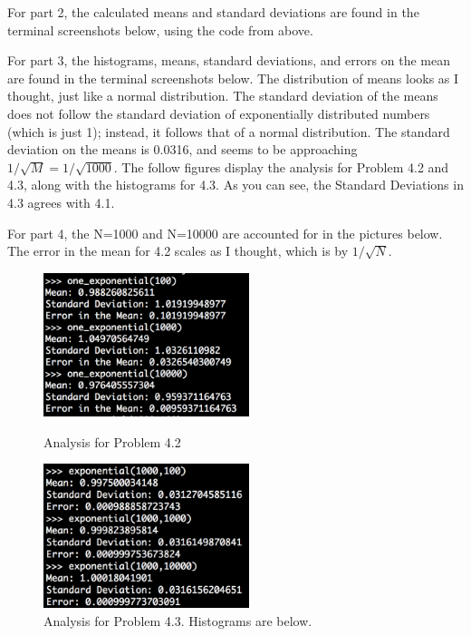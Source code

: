 \documentclass[12pt]{article}
\begin{document}
For part 2, the calculated means and standard deviations are found in the terminal screenshots below, using the code from above. 

For part 3, the histograms, means, standard deviations, and errors on the mean are found in the terminal screenshots below. The distribution of means looks as I thought, just like a normal distribution. The standard deviation of the means does not follow the standard deviation of exponentially distributed numbers (which is just 1); instead, it follows that of a normal distribution. The standard deviation on the means is 0.0316, and seems to be approaching $1/\sqrt{M} = 1/\sqrt{1000}$.
 The follow figures display the analysis for Problem 4.2 and 4.3, along with the histograms for 4.3. As you can see, the Standard Deviations in 4.3 agrees with 4.1. 

For part 4, the N=1000 and N=10000 are accounted for in the pictures below. The error in the mean for 4.2 scales as I thought, which is by $1/\sqrt{N}$.

\begin{figure}[ht]
	\centering
	\begin{minipage}[b]{0.47\linewidth}
		\includegraphics[width = 6cm]{P4_2.PNG}
		\caption{Analysis for Problem 4.2}
		\label{fig:minipage1}
	\end{minipage}
	\quad
	\begin{minipage}[b]{0.47\linewidth}
		\includegraphics[width = 6cm]{P4_3.PNG}
		\caption{Analysis for Problem 4.3. Histograms are below.}
		\label{fig:minipage2}
	\end{minipage}
\end{figure}
\end{document}
